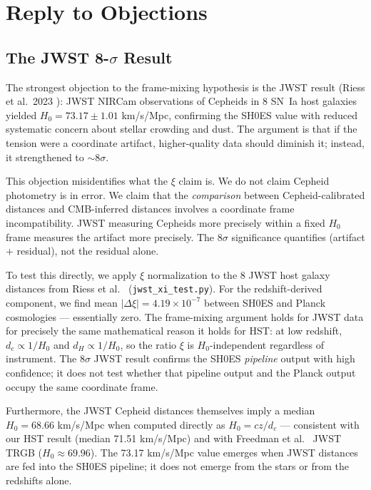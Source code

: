 \documentclass[12pt,a4paper]{article}
\begin{document}
\section{Reply to Objections}

\subsection{The JWST 8-$\sigma$ Result}

The strongest objection to the frame-mixing hypothesis is the JWST result
(Riess et al.\ 2023 \citeyear{riess2023jwst}): JWST NIRCam observations
of Cepheids in 8 SN~Ia host galaxies yielded $H_0 = 73.17 \pm 1.01$
km/s/Mpc, confirming the SH0ES value with reduced systematic concern
about stellar crowding and dust. The argument is that if the tension were
a coordinate artifact, higher-quality data should diminish it; instead,
it strengthened to $\sim$8$\sigma$.

This objection misidentifies what the $\xi$ claim is. We do not claim
Cepheid photometry is in error. We claim that the \emph{comparison}
between Cepheid-calibrated distances and CMB-inferred distances involves
a coordinate frame incompatibility. JWST measuring Cepheids more
precisely within a fixed $H_0$ frame measures the artifact more
precisely. The 8$\sigma$ significance quantifies (artifact $+$ residual),
not the residual alone.

To test this directly, we apply $\xi$ normalization to the 8 JWST host
galaxy distances from Riess et al.\ \citeyear{riess2023jwst}
(\texttt{jwst\_xi\_test.py}). For the redshift-derived component, we find
mean $|\Delta\xi| = 4.19 \times 10^{-7}$ between SH0ES and Planck
cosmologies --- essentially zero. The frame-mixing argument holds for JWST
data for precisely the same mathematical reason it holds for HST: at low
redshift, $d_c \propto 1/H_0$ and $d_H \propto 1/H_0$, so the ratio
$\xi$ is $H_0$-independent regardless of instrument. The 8$\sigma$ JWST
result confirms the SH0ES \emph{pipeline} output with high confidence; it
does not test whether that pipeline output and the Planck output occupy
the same coordinate frame.

Furthermore, the JWST Cepheid distances themselves imply a median
$H_0 = 68.66$ km/s/Mpc when computed directly as $H_0 = cz/d_c$ ---
consistent with our HST result (median 71.51 km/s/Mpc) and with
Freedman et al.\ \citeyear{freedman2024} JWST TRGB ($H_0 \approx
69.96$). The 73.17 km/s/Mpc value emerges when JWST distances are fed
into the SH0ES pipeline; it does not emerge from the stars or from the
redshifts alone.
\end{document}
